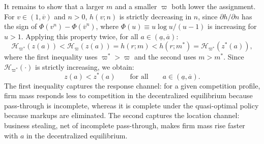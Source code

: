 It remains to show that a larger $m$ and a smaller $\varpi$ both lower the assignment. For $v \in (1, \overline{v})$ and $n > 0$, $h(v;n)$ is strictly decreasing in $n$, since $\partial h/\partial n$ has the sign of $\Phi(v^n) - \Phi(\overline{v}^n)$, where $\Phi(u) \equiv u \log u / (u - 1)$ is increasing for $u > 1$. Applying this property twice, for all $a \in (\underline{a}, \overline{a})$:
%
\begin{equation*}
    \mathcal{H}_{\varpi^*}\left(z(a)\right) < \mathcal{H}_{\varpi}\left(z(a)\right) = h(r;m) < h(r;m^*) = \mathcal{H}_{\varpi^*}\left(z^*(a)\right),
\end{equation*}
%
where the first inequality uses $\varpi^* > \varpi$ and the second uses $m > m^*$. Since $\mathcal{H}_{\varpi^*}(\cdot)$ is strictly increasing, we obtain:
%
\begin{equation*}
    z(a) < z^*(a) \qquad \text{for all} \qquad a \in (\underline{a}, \overline{a}).
\end{equation*}
%
The first inequality captures the response channel: for a given competition profile, firm mass responds less to competition in the decentralized equilibrium because pass-through is incomplete, whereas it is complete under the quasi-optimal policy because markups are eliminated. The second captures the location channel: business stealing, net of incomplete pass-through, makes firm mass rise faster with $a$ in the decentralized equilibrium.

